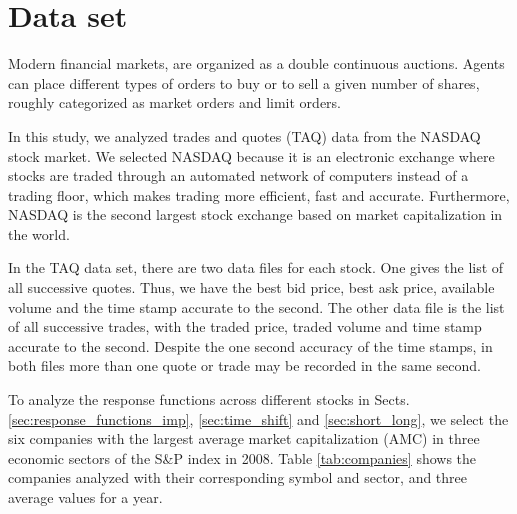 \section{Data set}\label{sec:data}

Modern financial markets, are organized as a double continuous auctions. Agents
can place different types of orders to buy or to sell a given number of shares,
roughly categorized as market orders and limit orders.

In this study, we analyzed trades and quotes (TAQ) data from the NASDAQ stock
market. We selected NASDAQ because it is an electronic exchange where stocks
are traded through an automated network of computers instead of a trading
floor, which makes trading more efficient, fast and accurate. Furthermore,
NASDAQ is the second largest stock exchange based on market capitalization
in the world.

In the TAQ data set, there are two data files for each stock. One gives the
list of all successive quotes. Thus, we have the best bid price, best ask
price, available volume and the time stamp accurate to the second. The other
data file is the list of all successive trades, with the traded price, traded
volume and time stamp accurate to the second. Despite the one second accuracy
of the time stamps, in both files more than one quote or trade may be recorded
in the same second.

To analyze the response functions across different stocks in Sects.
\ref{sec:response_functions_imp}, \ref{sec:time_shift} and
\ref{sec:short_long}, we select the six companies with the largest average
market capitalization (AMC) in three economic sectors of the S\&P index in
2008. Table \ref{tab:companies} shows the companies analyzed with their
corresponding symbol and sector, and three average values for a year.

